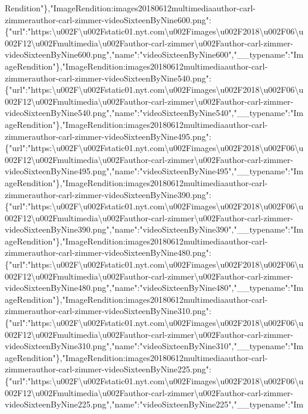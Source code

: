 Rendition"\},"ImageRendition:images20180612multimediaauthor-carl-zimmerauthor-carl-zimmer-videoSixteenByNine600.png":\{"url":"https:\textbackslash{}u002F\textbackslash{}u002Fstatic01.nyt.com\textbackslash{}u002Fimages\textbackslash{}u002F2018\textbackslash{}u002F06\textbackslash{}u002F12\textbackslash{}u002Fmultimedia\textbackslash{}u002Fauthor-carl-zimmer\textbackslash{}u002Fauthor-carl-zimmer-videoSixteenByNine600.png","name":"videoSixteenByNine600","\_\_typename":"ImageRendition"\},"ImageRendition:images20180612multimediaauthor-carl-zimmerauthor-carl-zimmer-videoSixteenByNine540.png":\{"url":"https:\textbackslash{}u002F\textbackslash{}u002Fstatic01.nyt.com\textbackslash{}u002Fimages\textbackslash{}u002F2018\textbackslash{}u002F06\textbackslash{}u002F12\textbackslash{}u002Fmultimedia\textbackslash{}u002Fauthor-carl-zimmer\textbackslash{}u002Fauthor-carl-zimmer-videoSixteenByNine540.png","name":"videoSixteenByNine540","\_\_typename":"ImageRendition"\},"ImageRendition:images20180612multimediaauthor-carl-zimmerauthor-carl-zimmer-videoSixteenByNine495.png":\{"url":"https:\textbackslash{}u002F\textbackslash{}u002Fstatic01.nyt.com\textbackslash{}u002Fimages\textbackslash{}u002F2018\textbackslash{}u002F06\textbackslash{}u002F12\textbackslash{}u002Fmultimedia\textbackslash{}u002Fauthor-carl-zimmer\textbackslash{}u002Fauthor-carl-zimmer-videoSixteenByNine495.png","name":"videoSixteenByNine495","\_\_typename":"ImageRendition"\},"ImageRendition:images20180612multimediaauthor-carl-zimmerauthor-carl-zimmer-videoSixteenByNine390.png":\{"url":"https:\textbackslash{}u002F\textbackslash{}u002Fstatic01.nyt.com\textbackslash{}u002Fimages\textbackslash{}u002F2018\textbackslash{}u002F06\textbackslash{}u002F12\textbackslash{}u002Fmultimedia\textbackslash{}u002Fauthor-carl-zimmer\textbackslash{}u002Fauthor-carl-zimmer-videoSixteenByNine390.png","name":"videoSixteenByNine390","\_\_typename":"ImageRendition"\},"ImageRendition:images20180612multimediaauthor-carl-zimmerauthor-carl-zimmer-videoSixteenByNine480.png":\{"url":"https:\textbackslash{}u002F\textbackslash{}u002Fstatic01.nyt.com\textbackslash{}u002Fimages\textbackslash{}u002F2018\textbackslash{}u002F06\textbackslash{}u002F12\textbackslash{}u002Fmultimedia\textbackslash{}u002Fauthor-carl-zimmer\textbackslash{}u002Fauthor-carl-zimmer-videoSixteenByNine480.png","name":"videoSixteenByNine480","\_\_typename":"ImageRendition"\},"ImageRendition:images20180612multimediaauthor-carl-zimmerauthor-carl-zimmer-videoSixteenByNine310.png":\{"url":"https:\textbackslash{}u002F\textbackslash{}u002Fstatic01.nyt.com\textbackslash{}u002Fimages\textbackslash{}u002F2018\textbackslash{}u002F06\textbackslash{}u002F12\textbackslash{}u002Fmultimedia\textbackslash{}u002Fauthor-carl-zimmer\textbackslash{}u002Fauthor-carl-zimmer-videoSixteenByNine310.png","name":"videoSixteenByNine310","\_\_typename":"ImageRendition"\},"ImageRendition:images20180612multimediaauthor-carl-zimmerauthor-carl-zimmer-videoSixteenByNine225.png":\{"url":"https:\textbackslash{}u002F\textbackslash{}u002Fstatic01.nyt.com\textbackslash{}u002Fimages\textbackslash{}u002F2018\textbackslash{}u002F06\textbackslash{}u002F12\textbackslash{}u002Fmultimedia\textbackslash{}u002Fauthor-carl-zimmer\textbackslash{}u002Fauthor-carl-zimmer-videoSixteenByNine225.png","name":"videoSixteenByNine225","\_\_typename":"Im